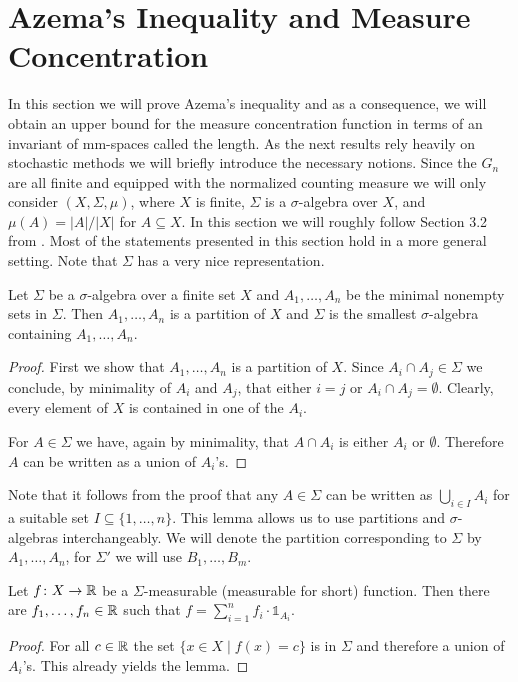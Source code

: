 \section{Azema's Inequality and Measure Concentration}\label{sec:azema}
In this section we will prove Azema's inequality and as a consequence, we will obtain an upper bound for the measure concentration function in terms of an invariant of mm-spaces called the length. As the next results rely heavily on stochastic methods we will briefly introduce the necessary notions. Since the $G_n$ are all finite and equipped with the normalized counting measure we will only consider  $(X,\Sigma,\mu)$, where $X$ is finite, $\Sigma$ is a $\sigma$-algebra over $X$, and $\mu(A)=|A|/|X|$ for $A\subseteq X$. In this section we will roughly follow Section 3.2 from \cite{Azema}. Most of the statements presented in this section hold in a more general setting. Note that $\Sigma$ has a very nice representation.%

\begin{lemma}
Let $\Sigma$ be a $\sigma$-algebra over a finite set $X$ and $A_1,\dots,A_n$ be the minimal nonempty sets in $\Sigma$. Then $A_1,\dots,A_n$ is a partition of $X$ and $\Sigma$ is the smallest $\sigma$-algebra containing $A_1,\dots,A_n$.
\end{lemma}
\begin{proof}
First we show that $A_1,\dots,A_n$ is a  partition of $X$. Since $A_i\cap A_j\in\Sigma$ we conclude, by minimality of $A_i$ and $A_j$, that either $i=j$ or $A_i\cap A_j=\emptyset$. Clearly, every element of $X$ is contained in one of the $A_i$. 

For $A\in\Sigma$ we have, again by minimality, that $A\cap A_i$ is either $A_i$ or $\emptyset$. Therefore $A$ can be written as a union of $A_i$'s.
\end{proof}
Note that it follows from the proof that any $A\in\Sigma$ can be written as $\bigcup_{i\in I}A_i$ for a suitable set $I\subseteq\{1,\dots,n\}$. This lemma allows us to use partitions and $\sigma$-algebras interchangeably. We will denote the partition corresponding to $\Sigma$ by $A_1,\dots,A_n$, for $\Sigma'$ we will use $B_1,\dots,B_{m}$.
\begin{lemma}\label{lem:measurabilityForm}
Let $f\colon X\to\mathbb{R}$ be a $\Sigma$-measurable (measurable for short) function. Then there are $f_1,\dots,f_n\in\mathbb{R}$ such that $f=\sum_{i=1}^{n}f_i\cdot\mathbb{1}_{A_i}$.
\end{lemma}
\begin{proof}
For all $c\in\mathbb{R}$ the set $\{x\in X\mid f(x)=c\}$ is in $\Sigma$ and therefore a union of $A_i$'s. This already yields the lemma.
\end{proof}


